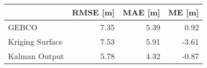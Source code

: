 \begin{tabular}{lrrr}
\toprule
 & RMSE [m] & MAE [m] & ME [m] \\
\midrule
GEBCO & 7.35 & 5.39 & 0.92 \\
Kriging Surface & 7.53 & 5.91 & -3.61 \\
Kalman Output & 5.78 & 4.32 & -0.87 \\
\bottomrule
\end{tabular}


